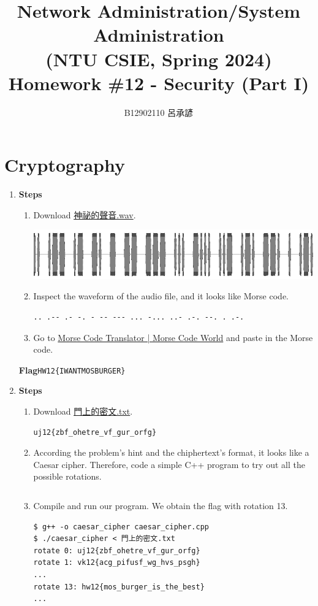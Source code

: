 \documentclass[12pt, a4paper]{article}
\title{
  \vspace{-1cm}
  Network Administration/System Administration\\
  (NTU CSIE, Spring 2024)\\
  Homework \#12 - Security (Part I)
}
\author{ \Large B12902110 呂承諺}
\begin{document}
  \maketitle

  \section{Cryptography}
  \begin{enumerate}[label=(\alph*)]
    \item \textbf{Steps}
    \begin{enumerate}[label=(\arabic*)]
      \item Download \href{https://drive.google.com/file/d/10iilD7B30Hw6zTYplIenI3CWs5wpIPZM/view?usp=drive_link}{神祕的聲音.wav}.

      \includegraphics[width=\linewidth]{1-a/1-a_waveform.png}

      \item Inspect the waveform of the audio file, and it looks like Morse code.
      \begin{Verbatim}[frame=single]
.. .-- .- -. - -- --- ... -... ..- .-. --. . .-.
      \end{Verbatim}
      \item Go to \href{https://morsecode.world/international/translator.html}{Morse Code Translator | Morse Code World}
      and paste in the Morse code.
    \end{enumerate}

    \textbf{Flag}\quad\verb|HW12{IWANTMOSBURGER}|

    \pagebreak
    \item \textbf{Steps}
    \begin{enumerate}[label=(\arabic*)]
      \item Download \href{https://drive.google.com/file/d/1HP6nANS-149jWhmyjAIOeEt4jSnxb3br/view?usp=drive_link}{門上的密文.txt}.
      \begin{Verbatim}[frame=single, commandchars=\\\{\}]
uj12{zbf_ohetre_vf_gur_orfg}
      \end{Verbatim}
      \item According the problem's hint and the chiphertext's format, it looks like a
      Caesar cipher. Therefore, code a simple C++ program to try out all the possible rotations.
      \inputminted[fontsize=\small]{cpp}{1-b/caesar_cipher.cpp}
      \item Compile and run our program. We obtain the flag with rotation 13.
      \begin{Verbatim}[frame=single]
$ g++ -o caesar_cipher caesar_cipher.cpp
$ ./caesar_cipher < 門上的密文.txt
rotate 0: uj12{zbf_ohetre_vf_gur_orfg}
rotate 1: vk12{acg_pifusf_wg_hvs_psgh}
...
rotate 13: hw12{mos_burger_is_the_best}
...
      \end{Verbatim}
    \end{enumerate}


\end{enumerate}
\end{document}

